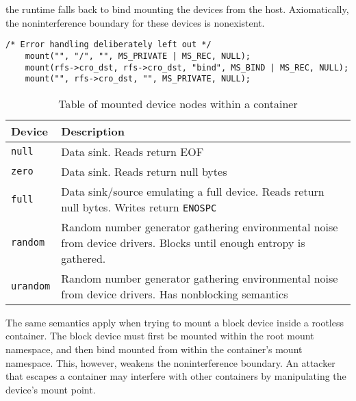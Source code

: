 the runtime falls back to bind mounting the devices from the host. 
Axiomatically, the noninterference boundary for these devices is nonexistent. 
\begin{lstlisting}[style=c-code-snippets, label={code:implementation/namespaces/mount}, caption={Remounting the original root filesystem to disable mount propagation events and bind mounting the container's root filesystem onto itself.}]
    /* Error handling deliberately left out */
    mount("", "/", "", MS_PRIVATE | MS_REC, NULL);
    mount(rfs->cro_dst, rfs->cro_dst, "bind", MS_BIND | MS_REC, NULL);
    mount("", rfs->cro_dst, "", MS_PRIVATE, NULL);
\end{lstlisting}

\begin{table}[h!]
    \centering
    \begin{tabular}{ |m{4cm}|m{20em}| }
        \hline
        Device & Description \\
        \hline
        \verb|null| & Data sink. Reads return EOF \\
        \hline 
        \verb|zero| & Data sink. Reads return null bytes \\
        \hline
        \verb|full| & Data sink/source emulating a full device. Reads return null bytes. Writes return \verb|ENOSPC| \\
        \hline
        \verb|random| & Random number generator gathering environmental noise from device drivers. Blocks until enough entropy is gathered. \\
        \hline
        \verb|urandom| & Random number generator gathering environmental noise from device drivers. Has nonblocking semantics \\
        \hline
    \end{tabular}
    \caption{Table of mounted device nodes within a container}
    \label{table:implementation/runtime/devices}
\end{table}

The same semantics apply when trying to mount a block device inside a 
rootless container. The block device must first be mounted within the root mount namespace, and 
then bind mounted from within the container's mount namespace. This, however, weakens the 
noninterference boundary. An attacker that escapes a container may interfere with other containers
by manipulating the device's mount point.

